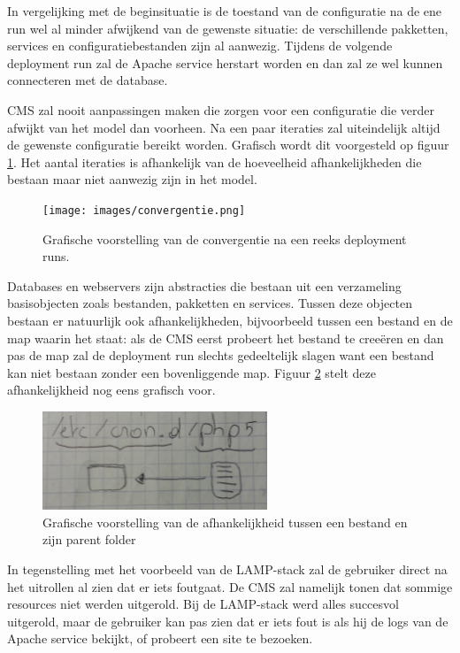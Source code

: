 In vergelijking met de beginsituatie is de toestand van de configuratie na de ene run wel al minder afwijkend van de gewenste situatie:
de verschillende pakketten, services en configuratiebestanden zijn al aanwezig.
Tijdens de volgende deployment run zal de Apache service herstart worden en dan zal ze wel kunnen connecteren met de database.

CMS zal nooit aanpassingen maken die zorgen voor een configuratie die verder afwijkt van het model dan voorheen.
Na een paar iteraties zal uiteindelijk altijd de gewenste configuratie bereikt worden. 
Grafisch wordt dit voorgesteld op figuur \ref{fig:convergentie}.
Het aantal iteraties is afhankelijk van de hoeveelheid afhankelijkheden die bestaan maar niet aanwezig zijn in het model.

\begin{figure}
    \begin{center}
    \texttt{[image: images/convergentie.png]}
    \caption{Grafische voorstelling van de convergentie na een reeks deployment runs.}
    \label{fig:convergentie}
    \end{center}
\end{figure}

Databases en webservers zijn abstracties die bestaan uit een verzameling basisobjecten zoals bestanden, pakketten en services.
Tussen deze objecten bestaan er natuurlijk ook afhankelijkheden, bijvoorbeeld tussen een bestand en de map waarin het staat:
als de CMS eerst probeert het bestand te cree\"eren en dan pas de map zal de deployment run slechts gedeeltelijk slagen want een bestand kan niet bestaan
zonder een bovenliggende map.
Figuur \ref{fig:file_dir_dep} stelt deze afhankelijkheid nog eens grafisch voor.
\begin{figure}
    \begin{center}
    \includegraphics[width=0.6\textwidth]{images/file_dir_dep.png}
    \caption{Grafische voorstelling van de afhankelijkheid tussen een bestand en zijn parent folder}
    \label{fig:file_dir_dep}
    \end{center}
\end{figure}
In tegenstelling met het voorbeeld van de LAMP-stack zal de gebruiker direct na het uitrollen al zien dat er iets foutgaat.
De CMS zal namelijk tonen dat sommige resources niet werden uitgerold.
Bij de LAMP-stack werd alles succesvol uitgerold, maar de gebruiker kan pas zien dat er iets fout is als hij de logs van de Apache service bekijkt, of probeert een site te bezoeken.

